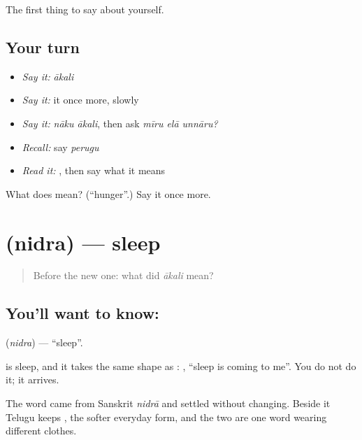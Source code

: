 \begin{grammarlens}[title={What you've built}]
The first thing to say about yourself.
\end{grammarlens}

\subsection*{Your turn}
\begin{itemize}
\raggedright
  \item \emph{Say it:} \emph{ākali}
  \item \emph{Say it:} it once more, slowly
  \item \emph{Say it:} \emph{nāku ākali}, then ask \emph{mīru elā unnāru?}
  \item \emph{Recall:} say \emph{perugu}
  \item \emph{Read it:} \textbf{}, then say what it means
\end{itemize}

\begin{tcolorbox}[breakable,colback=teal!4,colframe=teal!35!black,title={Before you move on}]
What does  mean? (\textquotedblleft{}hunger\textquotedblright{}.) Say it once more.
\end{tcolorbox}
\section[\texorpdfstring{\te{నిద్ర} (nidra)}{నిద్ర (nidra)}]{ (nidra) — sleep}

\label{lesson:TE-C63-sleep}



\begin{quote}
Before the new one: what did \emph{ākali} mean?
\end{quote}

\subsection*{You'll want to know: }
\textbf{} (\emph{nidra}) — \textquotedblleft{}sleep\textquotedblright{}.

 is sleep, and it takes the same shape as :   , \textquotedblleft{}sleep is coming to me\textquotedblright{}. You do not do it; it arrives.

The word came from Sanskrit \emph{nidrā} and settled without changing. Beside it Telugu keeps , the softer everyday form, and the two are one word wearing different clothes.

